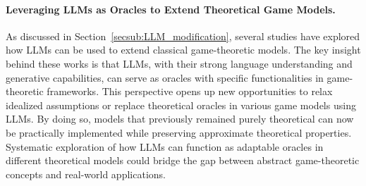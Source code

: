 \paragraph{Leveraging LLMs as Oracles to Extend Theoretical Game Models.}
As discussed in Section~\ref{secsub:LLM_modification}, several studies have explored how LLMs can be used to extend classical game-theoretic models. The key insight behind these works is that LLMs, with their strong language understanding and generative capabilities, can serve as oracles with specific functionalities in game-theoretic frameworks. This perspective opens up new opportunities to relax idealized assumptions or replace theoretical oracles in various game models using LLMs. By doing so, models that previously remained purely theoretical can now be practically implemented while preserving approximate theoretical properties.
Systematic exploration of how LLMs can function as adaptable oracles in different theoretical models could bridge the gap between abstract game-theoretic concepts and real-world applications.
